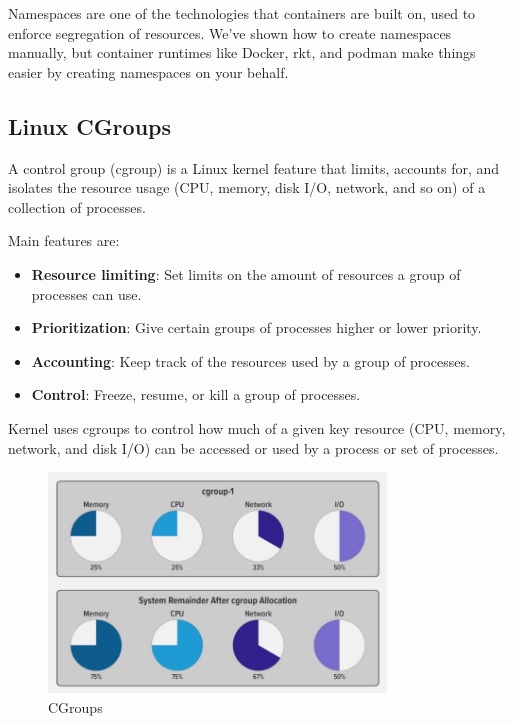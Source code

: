 Namespaces are one of the technologies that containers are built on,
used to enforce segregation of resources. We’ve shown how to
create namespaces manually, but container runtimes like Docker, rkt,
and podman make things easier by creating namespaces on your
behalf.

\subsection{Linux CGroups}

A control group (cgroup) is a Linux kernel feature that limits, accounts for, and
isolates the resource usage (CPU, memory, disk I/O, network, and so on) of a
collection of processes.

Main features are:
\begin{itemize}
    \item \textbf{Resource limiting}: Set limits on the amount of resources a group of processes can use.
    \item \textbf{Prioritization}: Give certain groups of processes higher or lower priority.
    \item \textbf{Accounting}: Keep track of the resources used by a group of processes.
    \item \textbf{Control}: Freeze, resume, or kill a group of processes.
\end{itemize}

Kernel uses cgroups to control how much of a given key resource (CPU, memory,
network, and disk I/O) can be accessed or used by a process or set of processes.

\begin{figure}[H]
    \centering
    \includegraphics[width=0.8\textwidth]{assets/fig37.png}
    \caption{CGroups}
\end{figure}

